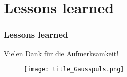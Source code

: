 \documentclass[
	11pt, %
	aspectratio=169, %
]{beamer}
\begin{document}

 \section{Lessons learned}

 \begin{frame}
 	\frametitle{Lessons learned}

 \end{frame}



\begin{frame} %
	 	\begin{center}
		
		\bigskip \bigskip %
		
		{\Large Vielen Dank für die Aufmerksamkeit!}
		\begin{figure}
			\texttt{[image: title\_Gausspuls.png]}
		\end{figure}
	\end{center}
 \end{frame}

\end{document}
